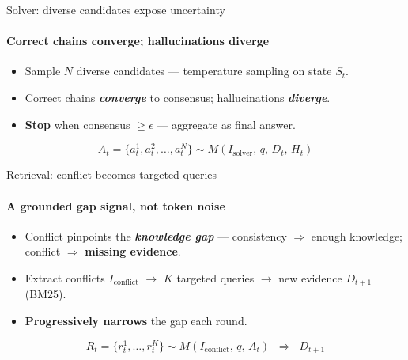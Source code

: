 \documentclass[10pt, aspectratio=169, t]{beamer}   %
\newcommand{\good}[1]{{\color{posblue}\bfseries #1}}  %
\newcommand{\warn}[1]{{\color{negmag}\bfseries #1}}   %
\begin{document}
\begin{frame}{Solver: diverse candidates expose uncertainty}
  \framesubtitle{Correct chains converge; hallucinations diverge}
  \vfill
  \begin{itemize}\setlength{\itemsep}{13pt}
    \item Sample $N$ diverse candidates — temperature sampling on state $S_t$.
    \item Correct chains \good{\emph{converge}} to consensus; hallucinations \warn{\emph{diverge}}.
    \item \textbf{Stop} when consensus $\ge \epsilon$ — aggregate as final answer.
  \end{itemize}
  \vfill
  \begin{tcolorbox}[title={Candidate generation \;(Eq.~2)}]
    \[ A_t = \{a_t^1, a_t^2, \dots, a_t^N\} \sim M(I_{\text{solver}},\, q,\, D_t,\, H_t) \]
  \end{tcolorbox}
  \vfill
\end{frame}

\begin{frame}{Retrieval: conflict becomes targeted queries}
  \framesubtitle{A grounded gap signal, not token noise}
  \vfill
  \begin{itemize}\setlength{\itemsep}{13pt}
    \item Conflict pinpoints the \warn{\emph{knowledge gap}} — consistency $\Rightarrow$ enough knowledge; conflict $\Rightarrow$ \warn{missing evidence}.
    \item Extract conflicts $I_{\text{conflict}}$ $\to$ $K$ targeted queries $\to$ new evidence $D_{t+1}$ (BM25).
    \item \good{Progressively narrows} the gap each round.
  \end{itemize}
  \vfill
  \begin{tcolorbox}[title={Conflict-guided retrieval \;(Eq.~3)}]
    \[ R_t = \{r_t^1, \dots, r_t^K\} \sim M(I_{\text{conflict}},\, q,\, A_t)\;\;\Rightarrow\;\; D_{t+1} \]
  \end{tcolorbox}
  \vfill
\end{frame}
\end{document}

